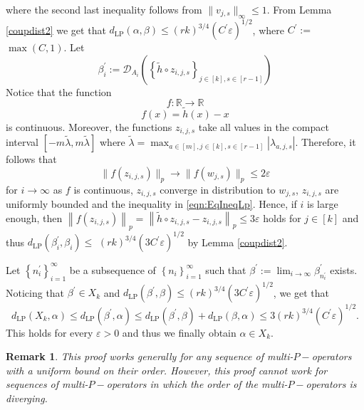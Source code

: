 \documentclass[11pt]{article}
\newtheorem{remark}[theorem]{Remark}
\def\R{\mathbb{R}}
\begin{document}
where the second last inequality follows from $\|v_{j,s}\|_{\infty}\leq 1$.
From Lemma \ref{coupdist2} we get that $d_{\mathrm{LP}}(\alpha, \beta) \leq(r k)^{3 / 4}\left(C^{\prime} \varepsilon\right)^{1 / 2}$, where $C^{\prime}:=$ $\max (C, 1)$.
Let
$$
\beta_{i}^{\prime}:=\mathcal{D}_{A_{i}}\left(\left\{\tilde{h} \circ z_{i, j,s}\right\}_{j\in [k],s\in [r-1]}\right)
$$Notice that the function $$f:\R\longrightarrow \R$$ $$f(x)=\tilde{h}(x)-x$$ is continuous. %
Moreover, the functions $z_{i,j,s}$ take all values in the compact interval $[-m \tilde\lambda,m\tilde\lambda]$ where $\tilde \lambda= \max_{a\in[m],j\in[k] ,s\in [r-1]}{|\lambda_{a,j,s}|}$. Therefore, it follows that 
$$
\|f(z_{i,j,s})\|_p\rightarrow\|f(w_{j,s})\|_p\leq 2 \varepsilon
$$
for $i\rightarrow \infty$ as $f$ is continuous, $z_{i,j,s}$ converge in distribution to $w_{j,s}$, $z_{i,j,s}$ are uniformly bounded and the inequality in \eqref{eqn:EqIneqLp}.
Hence, if $i$ is large enough, then $\left\|f(z_{i, j,s})\right\|_{p}=\left\|\tilde{h} \circ z_{i, j,s}-z_{i, j,s}\right\|_{p} \leq 3 \varepsilon$ holds for $j \in[k]$ and thus $d_{\mathrm{LP}}\left(\beta_{i}^{\prime}, \beta_{i}\right) \leq$ $(r k)^{3 / 4}\left(3 C^{\prime} \varepsilon\right)^{1 / 2}$ by Lemma \ref{coupdist2}.

Let $\left\{n_{i}^{\prime}\right\}_{i=1}^{\infty}$ be a subsequence of $\left\{n_{i}\right\}_{i=1}^{\infty}$ such that $\beta^{\prime}:=\lim _{i \rightarrow \infty} \beta_{n_{i}^{\prime}}^{\prime}$ exists. Noticing that $\beta^{\prime} \in X_{k}$ and $d_{\mathrm{LP}}\left(\beta^{\prime}, \beta\right) \leq(r k)^{3 / 4}\left(3 C^{\prime} \varepsilon\right)^{1 / 2}$, we get that
$$
d_{\mathrm{LP}}\left(X_{k}, \alpha\right) \leq d_{\mathrm{LP}}\left(\beta^{\prime}, \alpha\right) \leq d_{\mathrm{LP}}\left(\beta^{\prime}, \beta\right)+d_{\mathrm{LP}}(\beta, \alpha) \leq 3(r k)^{3 / 4}\left(C^{\prime} \varepsilon\right)^{1 / 2} .
$$
This holds for every $\varepsilon>0$ and thus we finally obtain $\alpha \in X_{k}$.

\begin{remark}
    This proof works generally for any sequence of multi-$P-$operators with a uniform  bound on their order. However, this proof cannot work for sequences of multi-$P-$operators in which the order of the multi-$P-$operators is diverging.  
\end{remark}
\end{document}
